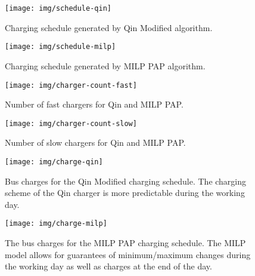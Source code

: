 \documentclass[utf8]{FrontiersinHarvard}
\begin{document}
\begin{subfigures}
    \begin{figure}[htpb]
    \centering
        \texttt{[image: img/schedule-qin]}
        \caption{Charging schedule generated by Qin Modified algorithm.}
        \label{subfig:qin-schedule}
    \end{figure}

    \hfill

    \begin{figure}[htpb]
    \centering
        \texttt{[image: img/schedule-milp]}
        \caption{Charging schedule generated by MILP PAP algorithm.}
        \label{subfig:milp-schedule}
    \end{figure}
\end{subfigures}

\begin{subfigures}
    \begin{figure}[htpb]
    \centering
        \texttt{[image: img/charger-count-fast]}
        \caption{Number of fast chargers for Qin and MILP PAP.}
        \label{subfig:fast-charger-usage}
    \end{figure}

    \hfill

    \begin{figure}[!ht]
    \centering
        \texttt{[image: img/charger-count-slow]}
        \caption{Number of slow chargers for Qin and MILP PAP.}
        \label{subfig:slow-charger-usage}
    \end{figure}
\end{subfigures}

\begin{subfigures}
    \begin{figure}[htpb]
    \centering
        \texttt{[image: img/charge-qin]}
        \caption{Bus charges for the Qin Modified charging schedule. The charging scheme of the Qin charger is more predictable during the working day.}
        \label{subfig:qin-charge}
    \end{figure}

    \hfill

    \begin{figure}[htpb]
    \centering
        \texttt{[image: img/charge-milp]}
        \caption{The bus charges for the MILP PAP charging schedule. The MILP model allows for guarantees of minimum/maximum changes during the working day as well as charges at the end of the day.}
        \label{subfig:milp-charge}
    \end{figure}
\end{subfigures}
\end{document}
